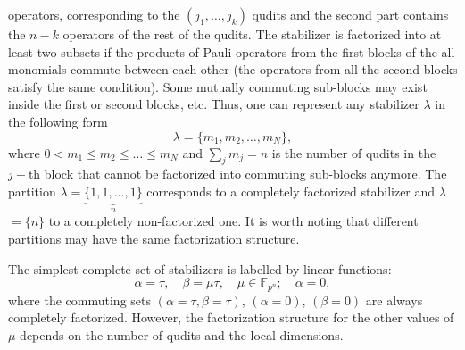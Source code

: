 \documentclass{article}
\begin{document}
operators, corresponding to the $(j_{1},\ldots ,j_{k})$ qudits and the
second part contains the $n-k$ operators of the rest of the qudits. The
stabilizer is factorized into at least two subsets if the products of Pauli
operators from the first blocks of the all monomials commute between each other
(the operators from all the second blocks satisfy the same condition). Some
mutually commuting sub-blocks may exist inside the first or second blocks, etc.
Thus, one can represent any stabilizer $\lambda $ in the following form 
\begin{equation}
  \lambda = \{m_{1}, m_{2}, \ldots, m_{N}\},
  \label{curve_part}
\end{equation}
where $0<m_{1}\leq m_{2}\leq \ldots \leq m_{N}$ and $\sum_{j}m_{j}=n$
is the number of qudits in the $j-$th block that cannot be factorized into
commuting sub-blocks anymore. The partition $\lambda =\underbrace{\{1,1,\ldots
,1\}}_{n}$ corresponds to a completely factorized stabilizer and $\lambda $
$=\{n\}$ to a completely non-factorized one. It is worth noting that different
partitions may have the same factorization structure.

The simplest complete set of stabilizers is labelled by linear functions: 
\begin{equation}
  \alpha = \tau,
  \quad \beta = \mu \tau,
  \quad \mu \in \mathbb{F}_{p^{n}};
  \quad \alpha = 0,
  \label{rays}
\end{equation}
where the commuting sets $\left(\alpha = \tau, \beta = \tau \right)$, $\left(
\alpha = 0\right)$, $\left(\beta = 0\right)$ are always completely factorized.
However, the factorization structure for the other values of $\mu$ depends on
the number of qudits and the local dimensions.
\end{document}
